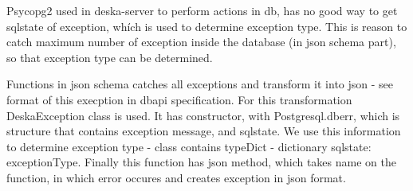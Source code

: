 \documentclass[deska]{subfiles}
\begin{document}
Psycopg2 used in deska-server to perform actions in db, has no good way to get sqlstate of exception, whích is used to determine exception type.
This is reason to catch maximum number of exception inside the database (in json schema part), so that exception type can be determined.

Functions in json schema catches all exceptions and transform it into json - see format of this execption in dbapi specification.
For this transformation DeskaException class is used. It has constructor, with Postgresql.dberr, which is structure that contains exception
message, and sqlstate. We use this information to determine exception type - class contains typeDict - dictionary {sqlstate: exceptionType}.
Finally this function has json method, which takes name on the function, in which error occures and creates exception in json format.
\end{document}
